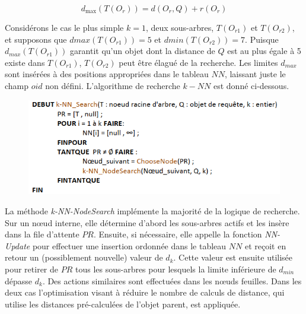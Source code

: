 \begin{equation}
d_{\max}(T(O_r)) =  d(O_r, Q)+r(O_r)
\end{equation}

Considérons le cas le plus simple $ k = 1 $, deux sous-arbres, $ T(O_{r1}) $ et $ T(O_{r2}) $, et supposons que $ dmax(T(O_{r1})) = 5 $ et $ dmin(T(O_{r2})) = 7 $. Puisque $ d_{max}(T(O_{r1})) $ garantit qu'un objet dont la distance de $  Q $ est au plus égale à 5 existe dans $ T(O_{r1}) $, $ T(O_{r2}) $ peut être élagué de la recherche. Les limites $ d_{max} $ sont insérées à des positions appropriées dans le tableau $ NN $, laissant juste le champ $ oid $ non défini. L'algorithme de recherche $ k-NN $ est donné ci-dessous.
\begin{figure}[H]
	\centering
	\includegraphics[width=.9 \textwidth]{Figures/knnsearch.png} %
\end{figure} 

La méthode \textit{k-NN-NodeSearch} implémente la majorité de la logique de recherche. Sur un nœud interne, elle détermine d'abord les sous-arbres actifs et les insère dans la file d'attente $ PR $. Ensuite, si nécessaire, elle appelle la fonction \textit{NN-Update} pour effectuer une insertion ordonnée dans le tableau $ NN $ et reçoit en retour un (possiblement nouvelle) valeur de $ d_k $. Cette valeur est ensuite utilisée pour retirer de $ PR $ tous les sous-arbres pour lesquels la limite inférieure de $ d_{min} $ dépasse $ d_{k} $. Des actions similaires sont effectuées dans les nœuds feuilles. Dans les deux cas l'optimisation visant à réduire le nombre de calculs de distance, qui utilise les distances pré-calculées de l'objet parent, est appliquée.

